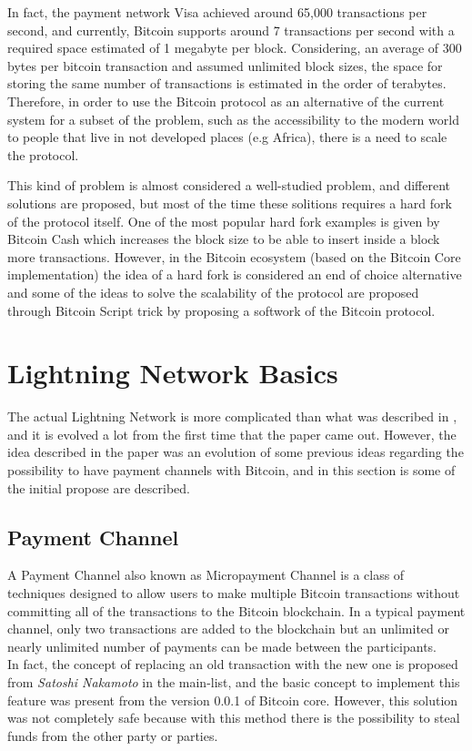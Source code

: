 In fact, the payment network Visa achieved around 65,000\cite{visa-sheet} transactions per second, and currently,
Bitcoin supports around 7 transactions per second with a required space estimated of 1 megabyte per block. Considering,
an average of 300 bytes per bitcoin transaction and assumed unlimited block sizes, the space for storing the same number
of transactions is estimated in the order of terabytes\cite{lightning-network-paper}. Therefore, in order to use the Bitcoin
protocol as an alternative of the current system for a subset of the problem, such as the accessibility to the modern world
to people that live in not developed places (e.g Africa), there is a need to scale the protocol.

This kind of problem is almost considered a well-studied problem, and different 
solutions are proposed, but most of the time these solitions requires a hard fork 
of the protocol itself.
One of the most popular hard fork examples is given by Bitcoin Cash which 
increases the block size to be able to insert inside a block more transactions.
However, in the Bitcoin ecosystem (based on the Bitcoin Core implementation) the idea of a hard fork is considered an
end of choice alternative and some of the ideas to solve the scalability of the protocol are proposed through Bitcoin Script trick 
by proposing a softwork of the Bitcoin protocol.

\section{Lightning Network Basics}

The actual Lightning Network is more complicated than what was described in \cite{lightning-network-paper}, and it is
evolved a lot from the first time that the paper came out. However, the idea described in the paper was an evolution
of some previous ideas regarding the possibility to have payment channels with Bitcoin, and in this section is 
some of the initial propose are described.

\subsection{Payment Channel}

A Payment Channel also known as Micropayment Channel is a class of techniques designed to allow users to make multiple
Bitcoin transactions without committing all of the transactions to the Bitcoin blockchain. In a typical payment channel,
only two transactions are added to the blockchain but an unlimited or nearly unlimited number of payments
can be made between the participants.\\
In fact, the concept of replacing an old transaction with the new one is proposed from \emph{Satoshi Nakamoto}
in the main-list\cite{payment-channels-satoshi}, and
the basic concept to implement this feature was present from the version 0.0.1 of Bitcoin core. However, this solution
was not completely safe because with this method there is the possibility to steal funds from the other party or parties.\\

